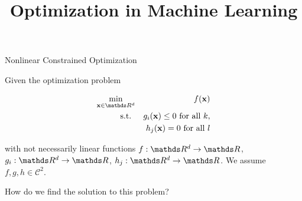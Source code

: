 \documentclass[11pt,compress,t,notes=noshow, xcolor=table]{beamer}
\title{Optimization in Machine Learning}
\date{}
\begin{document}
\sloppy
\begin{vbframe}{Nonlinear Constrained Optimization}

Given the optimization problem

\begin{eqnarray*}
 \min_{\xv \in \R^d} && f(\xv) \\
\text{s.t. } && g_i(\xv) \le 0 \text{ for all } k, \\
&& h_j(\xv) = 0 \text{ for all } l
\end{eqnarray*}

with not necessarily linear functions $f:\R^d \to \R$, $g_i:\R^d \to \R$, $h_j:\R^d \to \R$. We assume $f, g, h \in \mathcal{C}^2$. 

\lz 

How do we find the solution to this problem?

\end{vbframe}
\end{document}
